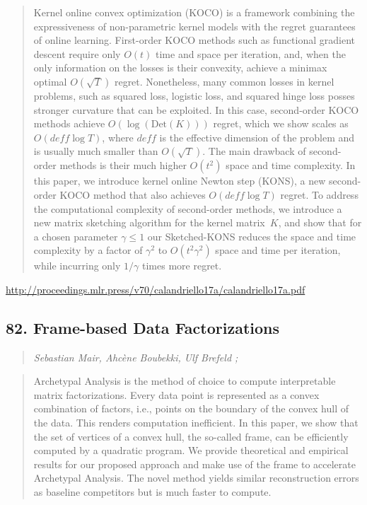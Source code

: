\documentclass{article}
\begin{document}
\begin{quote}
    Kernel online convex optimization (KOCO) is a framework combining the expressiveness of non-parametric kernel models with the regret guarantees of online learning. First-order KOCO methods such as functional gradient descent require only $O(t)$ time and space per iteration, and, when the only information on the losses is their convexity, achieve a minimax optimal $O(\sqrt{T})$ regret. Nonetheless, many common losses in kernel problems, such as squared loss, logistic loss, and squared hinge loss posses stronger curvature that can be exploited. In this case, second-order KOCO methods achieve $O(\log(\mathrm{Det}(K)))$ regret, which we show scales as $O(deff \log T)$, where $deff$ is the effective dimension of the problem and is usually much smaller than $O(\sqrt{T})$. The main drawback of second-order methods is their much higher $O(t^2)$ space and time complexity. In this paper, we introduce kernel online Newton step (KONS), a new second-order KOCO method that also achieves $O(deff\log T)$ regret. To address the computational complexity of second-order methods, we introduce a new matrix sketching algorithm for the kernel matrix~$K$, and show that for a chosen parameter $\gamma \leq 1$ our Sketched-KONS reduces the space and time complexity by a factor of $\gamma^2$ to $O(t^2\gamma^2)$ space and time per iteration, while incurring only $1/\gamma$ times more regret.  \end{quote}

\href{http://proceedings.mlr.press/v70/calandriello17a/calandriello17a.pdf}{http://proceedings.mlr.press/v70/calandriello17a/calandriello17a.pdf}

\subsection{82. Frame-based Data Factorizations}

\begin{quote}
\footnotesize{\textit{Sebastian Mair, Ahcène Boubekki, Ulf Brefeld ;}}
\end{quote}

\begin{quote}
    Archetypal Analysis is the method of choice to compute interpretable matrix factorizations. Every data point is represented as a convex combination of factors, i.e., points on the boundary of the convex hull of the data. This renders computation inefficient. In this paper, we show that the set of vertices of a convex hull, the so-called frame, can be efficiently computed by a quadratic program. We provide theoretical and empirical results for our proposed approach and make use of the frame to accelerate Archetypal Analysis. The novel method yields similar reconstruction errors as baseline competitors but is much faster to compute.  \end{quote}
\end{document}
